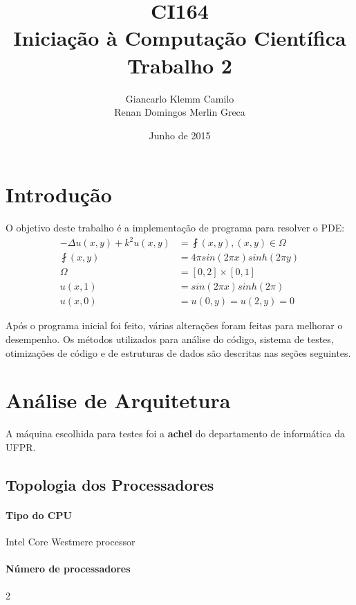 \documentclass[12pt]{article}
\title{CI164\\Iniciação à Computação Científica\\Trabalho 2}
\author{
	Giancarlo Klemm Camilo \\
	Renan Domingos Merlin Greca
}
\date{Junho de 2015}
\begin{document}
\maketitle
\newpage	

\tableofcontents
\newpage

\section{Introdução}
O objetivo deste trabalho é a implementação de programa para resolver o PDE:
\begin{align}
	- \Delta u(x,y) + k^2u(x,y) &= \fint (x,y),	(x,y) \in \Omega\\
	\fint(x,y) &= 4 \pi sin(2 \pi x) sinh(2 \pi y) \\
	\Omega &= [0,2] \times [0,1] \\
	u(x,1) &= sin(2 \pi x) sinh(2 \pi) \\
	u(x,0) &= u(0,y) = u(2,y) = 0
\end{align}

Após o programa inicial foi feito, várias alterações foram feitas para melhorar o desempenho. Os métodos utilizados para análise do código, sistema de testes, otimizações de código e de estruturas de dados são descritas nas seções seguintes.

\newpage

\section{Análise de Arquitetura}
A máquina escolhida para testes foi a \textbf{achel} do departamento de informática da UFPR.

\subsection{Topologia dos Processadores}
\paragraph{Tipo do CPU} Intel Core Westmere processor
\paragraph{Número de processadores} 2
\end{document}
